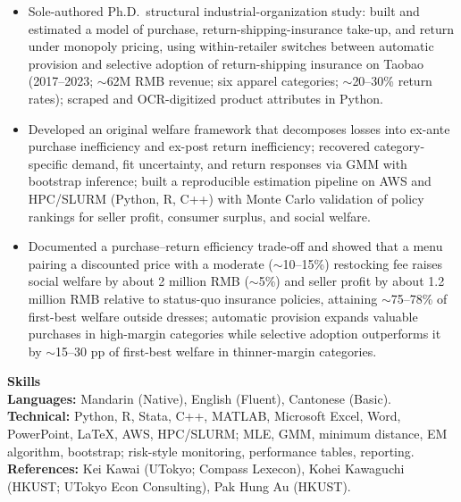 \documentclass[11pt,letterpaper]{article}
\begin{document}
\begin{itemize}
  \item Sole-authored Ph.D.\ structural industrial-organization study: built and estimated a model of purchase, return-shipping-insurance take-up, and return under monopoly pricing, using within-retailer switches between automatic provision and selective adoption of return-shipping insurance on Taobao (2017--2023; \(\sim\)62M RMB revenue; six apparel categories; \(\sim\)20--30\% return rates); scraped and OCR-digitized product attributes in Python.
  \item Developed an original welfare framework that decomposes losses into ex-ante purchase inefficiency and ex-post return inefficiency; recovered category-specific demand, fit uncertainty, and return responses via GMM with bootstrap inference; built a reproducible estimation pipeline on AWS and HPC/SLURM (Python, R, C++) with Monte Carlo validation of policy rankings for seller profit, consumer surplus, and social welfare.
  \item Documented a purchase--return efficiency trade-off and showed that a menu pairing a discounted price with a moderate (\(\sim\)10--15\%) restocking fee raises social welfare by about 2 million RMB (\(\sim\)5\%) and seller profit by about 1.2 million RMB relative to status-quo insurance policies, attaining \(\sim\)75--78\% of first-best welfare outside dresses; automatic provision expands valuable purchases in high-margin categories while selective adoption outperforms it by \(\sim\)15--30 pp of first-best welfare in thinner-margin categories.
\end{itemize}

\vspace{0.15pt}

{\large \textbf{Skills}}\\[-0.5pt]
\textbf{Languages:} Mandarin (Native), English (Fluent), Cantonese (Basic).\\
\textbf{Technical:} Python, R, Stata, C++, MATLAB, Microsoft Excel, Word, PowerPoint, \LaTeX, AWS, HPC/SLURM; MLE, GMM, minimum distance, EM algorithm, bootstrap; risk-style monitoring, performance tables, reporting.\\
\textbf{References:} Kei Kawai (UTokyo; Compass Lexecon), Kohei Kawaguchi (HKUST; UTokyo Econ Consulting), Pak Hung Au (HKUST).
\end{document}
